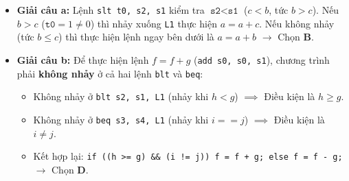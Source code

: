 \begin{itemize}
    \item \textbf{Giải câu a:} Lệnh \texttt{slt t0, s2, s1} kiểm tra $\texttt{s2} < \texttt{s1}$ ($c < b$, tức $b > c$). Nếu $b > c$ ($\texttt{t0} = 1 \neq 0$) thì nhảy xuống \texttt{L1} thực hiện $a = a + c$. Nếu không nhảy (tức \textbf{$b \le c$}) thì thực hiện lệnh ngay bên dưới là $a = a + b$ $\rightarrow$ Chọn \textbf{B}.
    \item \textbf{Giải câu b:} Để thực hiện lệnh $f = f + g$ (\texttt{add s0, s0, s1}), chương trình phải \textbf{không nhảy} ở cả hai lệnh \texttt{blt} và \texttt{beq}:
    \begin{itemize}
        \item Không nhảy ở \texttt{blt s2, s1, L1} (nhảy khi $h < g$) $\implies$ Điều kiện là \textbf{$h \ge g$}.
        \item Không nhảy ở \texttt{beq s3, s4, L1} (nhảy khi $i == j$) $\implies$ Điều kiện là \textbf{$i \neq j$}.
        \item Kết hợp lại: \texttt{if ((h >= g) \&\& (i != j)) f = f + g; else f = f - g;} $\rightarrow$ Chọn \textbf{D}.
    \end{itemize}
\end{itemize}

